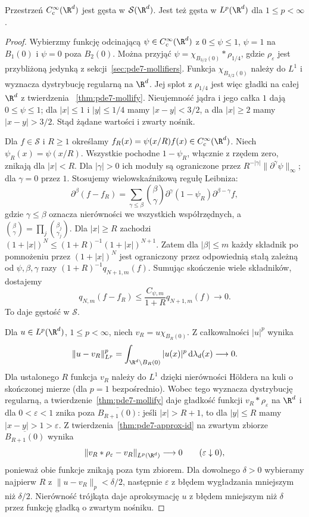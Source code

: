 \begin{twierdzenie}
\label{thm:pde8-density}
Przestrzeń $C_c^\infty(\R^d)$ jest gęsta w $\mathcal S(\R^d)$.
Jest też gęsta w $L^p(\R^d)$ dla $1\le p<\infty$.
\end{twierdzenie}
\begin{proof}
Wybierzmy funkcję odcinającą
$\psi\in C_c^\infty(\R^d)$ z $0\le\psi\le1$,
$\psi=1$ na $B_1(0)$ i $\psi=0$ poza $B_2(0)$.
Można przyjąć $\psi=\chi_{B_{3/2}(0)}*\rho_{1/4}$,
gdzie $\rho_\varepsilon$ jest przybliżoną jedynką
z sekcji~\ref{sec:pde7-mollifiers}.
Funkcja $\chi_{B_{3/2}(0)}$ należy do $L^1$
i wyznacza dystrybucję regularną na $\R^d$.
Jej splot z $\rho_{1/4}$ jest więc gładki
na całej $\R^d$ z twierdzenia
~\ref{thm:pde7-mollify}.
Nieujemność jądra i jego całka $1$ dają
$0\le\psi\le1$; dla $|x|\le1$ i $|y|\le1/4$
mamy $|x-y|<3/2$, a dla $|x|\ge2$ mamy
$|x-y|>3/2$. Stąd żądane wartości i zwarty nośnik.

Dla $f\in\mathcal S$ i $R\ge1$ określamy
$f_R(x)=\psi(x/R)f(x)\in C_c^\infty(\R^d)$.
Niech $\psi_R(x)=\psi(x/R)$.
Wszystkie pochodne $1-\psi_R$, włącznie z rzędem
zero, znikają dla $|x|<R$. Dla $|\gamma|>0$
ich moduły są ograniczone przez
$R^{-|\gamma|}\|\partial^\gamma\psi\|_\infty$;
dla $\gamma=0$ przez $1$.
Stosujemy wielowskaźnikową regułę Leibniza:
\[
 \partial^\beta(f-f_R)
 =\sum_{\gamma\le\beta}\binom{\beta}{\gamma}
 \partial^\gamma(1-\psi_R)\partial^{\beta-\gamma}f,
\]
gdzie $\gamma\le\beta$ oznacza nierówności
we wszystkich współrzędnych, a
$\binom{\beta}{\gamma}=\prod_j\binom{\beta_j}{\gamma_j}$.
Dla $|x|\ge R$ zachodzi
$(1+|x|)^N\le (1+R)^{-1}(1+|x|)^{N+1}$.
Zatem dla $|\beta|\le m$ każdy składnik po
pomnożeniu przez $(1+|x|)^N$ jest ograniczony
przez odpowiednią stałą zależną od $\psi,\beta,\gamma$
razy $(1+R)^{-1}q_{N+1,m}(f)$.
Sumując skończenie wiele składników, dostajemy
\[
 q_{N,m}(f-f_R)\le
 \frac{C_{\psi,m}}{1+R}q_{N+1,m}(f)
 \longrightarrow0.
\]
To daje gęstość w $\mathcal S$.

Dla $u\in L^p(\R^d)$, $1\le p<\infty$,
niech $v_R=u\chi_{B_R(0)}$. Z całkowalności
$|u|^p$ wynika
\[
 \|u-v_R\|_{L^p}^p
 =\int_{\R^d\setminus B_R(0)}|u(x)|^p
 \,\mathrm d\lambda_d(x)\longrightarrow0.
\]
Dla ustalonego $R$ funkcja $v_R$ należy
do $L^1$ dzięki nierówności Höldera na kuli
o skończonej mierze (dla $p=1$ bezpośrednio).
Wobec tego wyznacza dystrybucję regularną,
a twierdzenie~\ref{thm:pde7-mollify} daje
gładkość funkcji $v_R*\rho_\varepsilon$ na $\R^d$
i dla $0<\varepsilon<1$ znika poza
$\overline{B_{R+1}(0)}$: jeśli $|x|>R+1$,
to dla $|y|\le R$ mamy $|x-y|>1>\varepsilon$.
Z twierdzenia~\ref{thm:pde7-approx-id}
na zwartym zbiorze $\overline{B_{R+1}(0)}$
wynika
\[
 \|v_R*\rho_\varepsilon-v_R\|_{L^p(\R^d)}
 \longrightarrow0\qquad(\varepsilon\downarrow0),
\]
ponieważ obie funkcje znikają poza tym zbiorem.
Dla dowolnego $\delta>0$ wybieramy najpierw
$R$ z $\|u-v_R\|_p<\delta/2$, następnie
$\varepsilon$ z błędem wygładzania mniejszym
niż $\delta/2$. Nierówność trójkąta daje
aproksymację $u$ z błędem mniejszym niż $\delta$
przez funkcję gładką o zwartym nośniku.
\end{proof}


